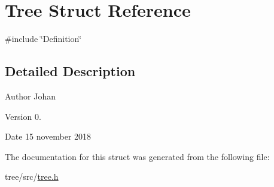 \hypertarget{structTree}{}\section{Tree Struct Reference}
\label{structTree}


{\ttfamily \#include \char`\"{}Definition\char`\"{}}



\subsection{Detailed Description}
\begin{DoxyAuthor}{Author}
Johan 
\end{DoxyAuthor}
\begin{DoxyVersion}{Version}
0. 
\end{DoxyVersion}
\begin{DoxyDate}{Date}
15 november 2018 
\end{DoxyDate}


The documentation for this struct was generated from the following file\+:\begin{DoxyCompactItemize}
\item 
tree/src/\mbox{\hyperlink{tree_8h}{tree.\+h}}\end{DoxyCompactItemize}
